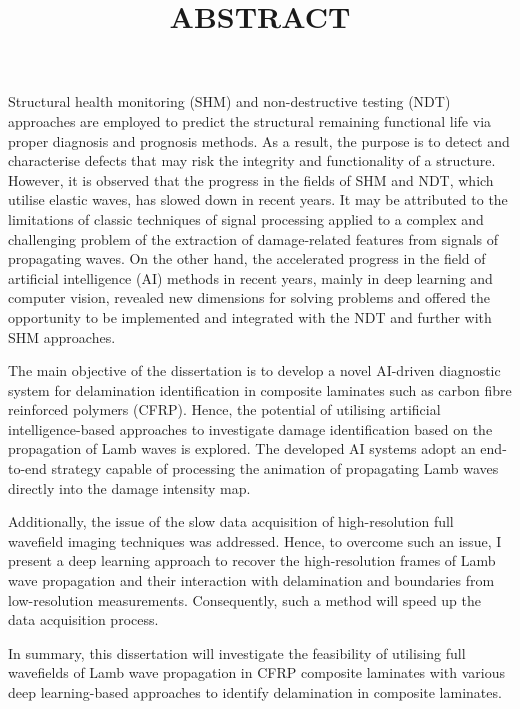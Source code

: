 \documentclass{article}
\title{ABSTRACT}
\date{}
\begin{document}
	\maketitle
	Structural health monitoring (SHM) and non-destructive testing (NDT) approaches are employed to predict the structural remaining functional life via proper diagnosis and prognosis methods.
	As a result, the purpose is to detect and characterise defects that may risk the integrity and functionality of a structure.
	However, it is observed that the progress in the fields of SHM and NDT, which utilise elastic waves, has slowed down in recent years.
	It may be attributed to the limitations of classic techniques of signal processing applied to a complex and challenging problem of the extraction of damage-related features from signals of propagating waves.
	On the other hand, the accelerated progress in the field of artificial intelligence (AI) methods in recent years, mainly in deep learning and computer vision, revealed new dimensions for solving problems and offered the opportunity to be implemented and integrated with the NDT and further with SHM approaches.
	
	The main objective of the dissertation is to develop a novel AI-driven diagnostic system for delamination identification in composite laminates such as carbon fibre reinforced polymers (CFRP).
	Hence, the potential of utilising artificial intelligence-based approaches to investigate damage identification based on the propagation of Lamb waves is explored.
	The developed AI systems adopt an end-to-end strategy capable of processing the animation of propagating Lamb waves directly into the damage intensity map.
	
	Additionally, the issue of the slow data acquisition of high-resolution full wavefield imaging techniques was addressed.
	Hence, to overcome such an issue, I present a deep learning approach to recover the high-resolution frames of Lamb wave propagation and their interaction with delamination and boundaries from low-resolution measurements.
	Consequently, such a method will speed up the data acquisition process.
	
	In summary, this dissertation will investigate the feasibility of utilising full wavefields of Lamb wave propagation in CFRP composite laminates with various deep learning-based approaches to identify delamination in composite laminates.
	
\end{document}
